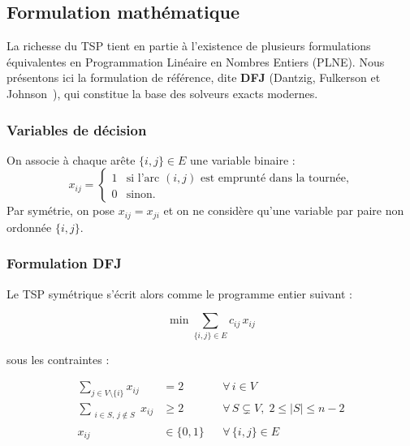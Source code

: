 \documentclass[12pt, a4paper, twoside, openright]{book}
\begin{document}
	\subsection{Formulation math\'ematique}
	\label{subsec:formulation_math}
	
	La richesse du TSP tient en partie à l'existence de plusieurs formulations
	équivalentes en Programmation Linéaire en Nombres Entiers (PLNE). Nous
	présentons ici la formulation de référence, dite \textbf{DFJ} (Dantzig,
	Fulkerson et Johnson~\cite{dantzig1954solution}), qui constitue la base des solveurs exacts modernes.
	
	\subsubsection*{Variables de d\'ecision}
	
	On associe à chaque arête $\{i,j\} \in E$ une variable binaire :
	$$
	x_{ij} = \begin{cases}
		1 & \text{si l'arc } (i,j) \text{ est emprunté dans la tournée,} \\
		0 & \text{sinon.}
	\end{cases}
	$$
	Par symétrie, on pose $x_{ij} = x_{ji}$ et on ne considère qu'une variable
	par paire non ordonnée $\{i,j\}$.
	
	\subsubsection*{Formulation DFJ}
	
	Le TSP symétrique s'écrit alors comme le programme entier suivant :
	
	\begin{equation}
		\min \sum_{\{i,j\} \in E} c_{ij}\, x_{ij}
		\label{eq:tsp_obj}
	\end{equation}
	
	sous les contraintes :
	
	\begin{align}
		\sum_{j \in V \setminus \{i\}} x_{ij} &= 2
		&& \forall\, i \in V
		\label{eq:tsp_degree} \\[6pt]
		\sum_{\substack{i \in S,\, j \notin S}} x_{ij} &\geq 2
		&& \forall\, S \subsetneq V,\; 2 \leq |S| \leq n-2
		\label{eq:tsp_sec} \\[6pt]
		x_{ij} &\in \{0, 1\}
		&& \forall\, \{i,j\} \in E
		\label{eq:tsp_bin}
	\end{align}
	
\end{document}
